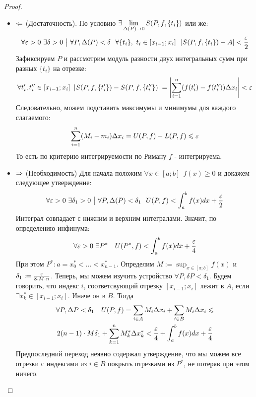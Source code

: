 \begin{proof}~
	\begin{itemize}
		\item $\Leftarrow$ (Достаточность). По условию  $\exists \lim\limits_{ \Delta(P) \to 0} S(P, f, \{t_i\})$ или же:
		\[
			\forall \eps > 0\ \exists \delta > 0 \such \forall P, \Delta(P) < \delta\ \ \forall \{t_i\},\ t_i \in [x_{i - 1}; x_i]\ \ |S(P, f, \{t_i\}) - A| < \frac{\eps}{2}
		\]
		Зафиксируем $P$ и рассмотрим модуль разности двух интегральных сумм при разных $\{t_i\}$ на отрезке:
		\[
			\forall t'_i, t''_i \in [x_{i - 1}; x_i]\ \left|S(P, f, \{t'_i\}) - S(P, f, \{t''_i\})\right| = \left|\sum\limits_{i = 1}^n (f(t'_i) - f(t''_i))\Delta x_i\right| < \varepsilon
		\]
		Следовательно, можем подставить максимумы и минимумы для каждого слагаемого:
		\[
			\sum\limits_{i = 1}^n (M_i - m_i) \Delta x_i = U(P, f) - L(P, f) \leqslant \varepsilon
		\]
		То есть по критерию интегрируемости по Риману $f$ - интегрируема.
		\item $\Rightarrow$ (Необходимость) Для начала положим $\forall x \in [a; b]\ \ f(x) \ge 0$ и докажем следующее утверждение:
		\[
			\forall \varepsilon > 0\ \exists \delta_1 > 0 \ \big|\  \forall P, \Delta(P) < \delta_1\ \ U(P, f) < \int_a^b f(x)dx + \frac{\varepsilon}{2}
		\]
		Интеграл совпадает с нижним и верхним интегралами. Значит, по определению инфинума:
		\[
			\forall \eps > 0\ \exists P^* \quad U(P^*, f) < \int_a^bf(x)dx + \frac{\eps}{4} 
		\]
		При этом $P^* \colon a = x^*_0 < \ldots < x^*_{n - 1}$. Определим $M := \sup_{x \in [a;b]}f(x)$ и $\delta_1 := \frac{\varepsilon}{8\cdot M\cdot n}$. Теперь, мы можем изучить устройство $\forall P, \delta P < \delta_1$. Будем говорить, что индекс $i$, соответсвующий отрезку $[x_{i - 1}; x_i]$ лежит в $A$, если $\exists x^*_k \in [x_{i - 1}; x_i]$. Иначе он в $B$. Тогда
		\begin{multline*}
			\forall P, \Delta P < \delta_1 \quad U(P, f) = \sum\limits_{i\in A} M_i\Delta x_i + \sum\limits_{i \in B} M_i\Delta x_i \leqslant
			\\
			2(n - 1) \cdot M\delta_1 + \sum\limits_{k = 1}^n M_k^*\Delta x_k^* < \frac{\varepsilon}{4} + \int_a^bf(x)dx + \frac{\varepsilon}{4}
		\end{multline*}
	Предпоследний переход неявно содержал утверждение, что мы можем все отрезки с индексами из $i \in B$ покрыть отрезками из $P^*$, не потеряв при этом ничего. 
	

\end{itemize}
\end{proof}
